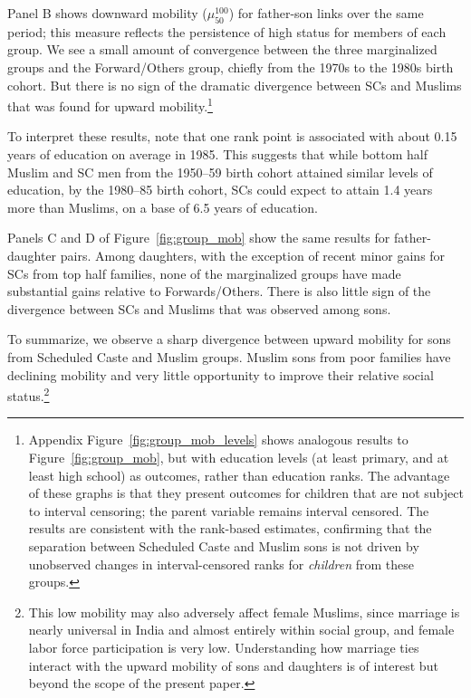 \documentclass[12pt,letterpaper]{article}
\numberwithin{equation}{section}
\begin{document}
Panel B shows downward mobility ($\mu_{50}^{100}$) for father-son links over the same period; this measure reflects the persistence of high status for members of each group. We see a small amount of convergence between the three marginalized groups and the Forward/Others group, chiefly from the 1970s to the 1980s birth cohort. But there is no sign of the dramatic divergence between SCs and Muslims that was found for upward mobility.\footnote{Appendix Figure~\ref{fig:group_mob_levels} shows analogous results to Figure~\ref{fig:group_mob}, but with education levels (at least primary, and at least high school) as outcomes, rather than education ranks. The advantage of these graphs is that they present outcomes for children that are not subject to interval censoring; the parent variable remains interval censored. The results are consistent with the rank-based estimates, confirming that the separation between Scheduled Caste and Muslim sons is not driven by unobserved changes in interval-censored ranks for \textit{children} from these groups.}

To interpret these results, note that one rank point is associated with about 0.15 years of education on average in 1985. This suggests that while bottom half Muslim and SC men from the 1950--59 birth cohort attained similar levels of education, by the 1980--85 birth cohort, SCs could expect to attain 1.4 years more than Muslims, on a base of 6.5 years of education.

Panels C and D of Figure~\ref{fig:group_mob} show the same results for father-daughter pairs. Among daughters, with the exception of recent minor gains for SCs from top half families, none of the marginalized groups have made substantial gains relative to Forwards/Others. There is also little sign of the divergence between SCs and Muslims that was observed among sons. 

To summarize, we observe a sharp divergence between upward mobility for sons from Scheduled Caste and Muslim groups. Muslim sons from poor families have declining mobility and very little opportunity to improve their relative social status.\footnote{This low mobility may also adversely affect female Muslims, since marriage is nearly universal in India and almost entirely within social group, and female labor force participation is very low. Understanding how marriage ties interact with the upward mobility of sons and daughters is of interest but beyond the scope of the present paper.}
\end{document}
